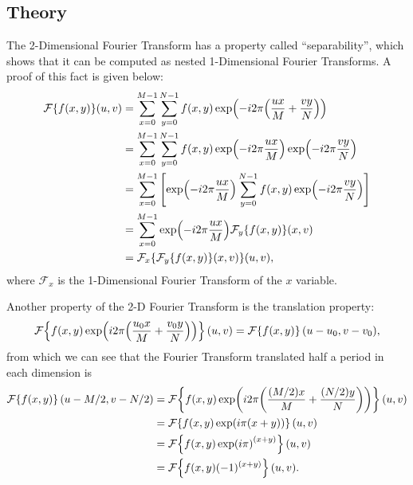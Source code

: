 \documentclass[headings=optiontoheadandtoc,listof=totoc,parskip=full]{scrartcl}
\begin{document}
\subsection{Theory}
The 2-Dimensional Fourier Transform has a property called ``separability'', which shows that it can be computed as nested 1-Dimensional Fourier Transforms. A proof of this fact is given below:
\begin{equation}
\label{eq:separability}
\begin{aligned}
	\mathcal{F}\{f(x,y)\}(u,v) &= \sum_{x = 0}^{M - 1} \sum_{y = 0}^{N - 1} f(x,y) \exp(-i2\pi\qty(\frac{ux}{M} + \frac{vy}{N}))\\
		&= \sum_{x = 0}^{M - 1} \sum_{y = 0}^{N - 1} f(x,y) \exp(-i2\pi\frac{ux}{M})\exp(-i2\pi\frac{vy}{N})\\
		&= \sum_{x = 0}^{M - 1} \qty[\exp(-i2\pi\frac{ux}{M}) \sum_{y = 0}^{N - 1} f(x,y) \exp(-i2\pi\frac{vy}{N})]\\
		&= \sum_{x = 0}^{M - 1} \exp(-i2\pi\frac{ux}{M}) \mathcal{F}_y\{f(x,y)\}(x,v)\\
		&= \mathcal{F}_x\{\mathcal{F}_y\{f(x,y)\}(x,v)\}(u,v),
\end{aligned}
\end{equation}
where $\mathcal{F}_x$ is the 1-Dimensional Fourier Transform of the $x$ variable.

Another property of the 2-D Fourier Transform is the translation property:
\begin{equation}
	\label{eq:translation}
	\mathcal{F}\qty{f(x,y)\exp(i2\pi\qty(\frac{u_0x}{M} + \frac{v_0y}{N}))}(u,v) = \mathcal{F}\qty{f(x,y)}(u - u_0,v - v_0),
\end{equation}
from which we can see that the Fourier Transform translated half a period in each dimension is
\begin{equation}
	\label{eq:translate-phase}
\begin{aligned}
		\mathcal{F}\qty{f(x,y)}(u - M/2,v - N/2) &= \mathcal{F}\qty{f(x,y)\exp(i2\pi\qty(\frac{(M / 2)x}{M} + \frac{(N / 2)y}{N}))}(u,v)\\
			&= \mathcal{F}\qty{f(x,y)\exp(i\pi\qty(x + y))}(u,v)\\
			&= \mathcal{F}\qty{f(x,y)\exp(i\pi)^{(x + y)}}(u,v)\\
			&= \mathcal{F}\qty{f(x,y)(-1)^{(x + y)}}(u,v).
\end{aligned}
\end{equation}
\end{document}
